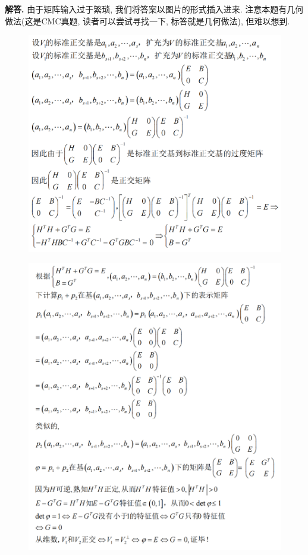 \documentclass{article}
\newenvironment{solution}{\par\noindent\textbf{解答. }}{\par}
\begin{document}
\begin{solution}
由于矩阵输入过于繁琐, 我们将答案以图片的形式插入进来. 注意本题有几何做法(这是CMC真题, 读者可以尝试寻找一下, 标答就是几何做法), 但难以想到.
\begin{figure}[htbp]
    \center
    \includegraphics[scale=0.46]{3.png}
\end{figure}
\begin{figure}[htbp]
    \center
    \includegraphics[scale=0.46]{4.png}
\end{figure}
\end{solution}
\end{document}
